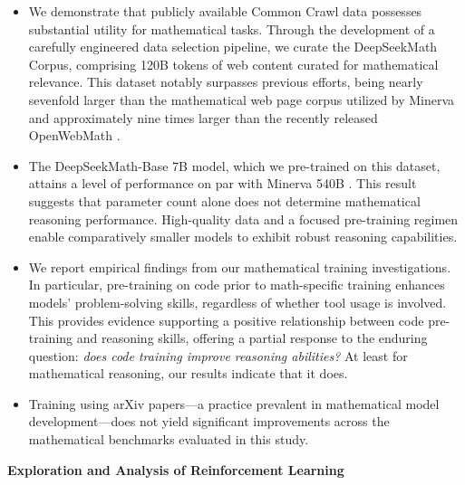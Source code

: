 \begin{itemize}[topsep=0pt]
    \item We demonstrate that publicly available Common Crawl data possesses substantial utility for mathematical tasks. Through the development of a carefully engineered data selection pipeline, we curate the DeepSeekMath Corpus, comprising 120B tokens of web content curated for mathematical relevance. This dataset notably surpasses previous efforts, being nearly sevenfold larger than the mathematical web page corpus utilized by Minerva \citep{minerva} and approximately nine times larger than the recently released OpenWebMath \citep{openwebmath}.

    \item The DeepSeekMath-Base 7B model, which we pre-trained on this dataset, attains a level of performance on par with Minerva 540B \citep{minerva}. This result suggests that parameter count alone does not determine mathematical reasoning performance. High-quality data and a focused pre-training regimen enable comparatively smaller models to exhibit robust reasoning capabilities.

    \item We report empirical findings from our mathematical training investigations. In particular, pre-training on code prior to math-specific training enhances models’ problem-solving skills, regardless of whether tool usage is involved. This provides evidence supporting a positive relationship between code pre-training and reasoning skills, offering a partial response to the enduring question: \textit{does code training improve reasoning abilities?} At least for mathematical reasoning, our results indicate that it does.

    \item Training using arXiv papers—a practice prevalent in mathematical model development—does not yield significant improvements across the mathematical benchmarks evaluated in this study.
\end{itemize}

\textbf{Exploration and Analysis of Reinforcement Learning}

